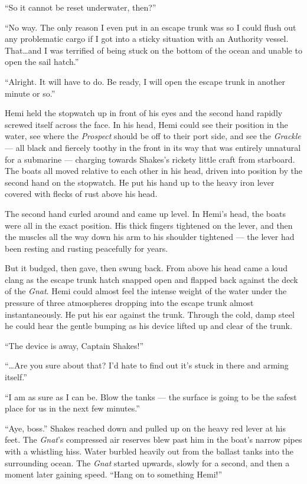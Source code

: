 \documentclass[
]{scrbook}
\begin{document}
``So it cannot be reset underwater, then?''

``No way. The only reason I even put in an escape trunk was so I could
flush out any problematic cargo if I got into a sticky situation with an
Authority vessel. That\ldots and I was terrified of being stuck on the
bottom of the ocean and unable to open the sail hatch.''

``Alright. It will have to do. Be ready, I will open the escape trunk in
another minute or so.''

Hemi held the stopwatch up in front of his eyes and the second hand
rapidly screwed itself across the face. In his head, Hemi could see
their position in the water, see where the \emph{Prospect} should be off
to their port side, and see the \emph{Grackle} --- all black and
fiercely toothy in the front in its way that was entirely unnatural for
a submarine --- charging towards Shakes's rickety little craft from
starboard. The boats all moved relative to each other in his head,
driven into position by the second hand on the stopwatch. He put his
hand up to the heavy iron lever covered with flecks of rust above his
head.

The second hand curled around and came up level. In Hemi's head, the
boats were all in the exact position. His thick fingers tightened on the
lever, and then the muscles all the way down his arm to his shoulder
tightened --- the lever had been resting and rusting peacefully for
years.

But it budged, then gave, then swung back. From above his head came a
loud clang as the escape trunk hatch snapped open and flapped back
against the deck of the \emph{Gnat}. Hemi could almost feel the intense
weight of the water under the pressure of three atmospheres dropping
into the escape trunk almost instantaneously. He put his ear against the
trunk. Through the cold, damp steel he could hear the gentle bumping as
his device lifted up and clear of the trunk.

``The device is away, Captain Shakes!''

``\ldots Are you sure about that? I'd hate to find out it's stuck in
there and arming itself.''

``I am as sure as I can be. Blow the tanks --- the surface is going to
be the safest place for us in the next few minutes.''

``Aye, boss.'' Shakes reached down and pulled up on the heavy red lever
at his feet. The \emph{Gnat}'s compressed air reserves blew past him in
the boat's narrow pipes with a whistling hiss. Water burbled heavily out
from the ballast tanks into the surrounding ocean. The \emph{Gnat}
started upwards, slowly for a second, and then a moment later gaining
speed. ``Hang on to something Hemi!''
\end{document}
